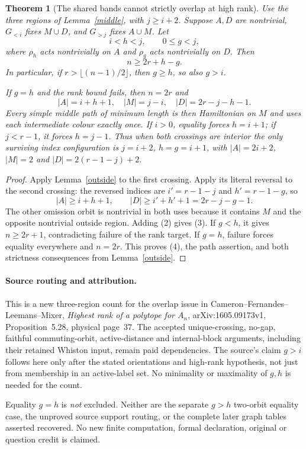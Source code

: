 \documentclass[11pt,a4paper]{article}
\newtheorem{theorem}[lemma]{Theorem}
\begin{document}
\begin{theorem}[The shared bands cannot strictly overlap at high rank]
\label{overlap}
Use the three regions of Lemma~\ref{middle}, with $j\geq i+2$.
Suppose $A,D$ are nontrivial, $G_{<i}$ fixes $M\cup D$,
and $G_{>j}$ fixes $A\cup M$. Let
\[
 i<h<j,\qquad 0\leq g<j,
\]
where $\rho_h$ acts nontrivially on $A$ and $\rho_g$ acts
nontrivially on $D$. Then
\[
                              n\geq2r+h-g.              \tag{3}
\]
In particular, if $r>\lfloor(n-1)/2\rfloor$, then $g\geq h$,
so also $g>i$.

If $g=h$ and the rank bound fails, then $n=2r$ and
\[
 |A|=i+h+1,\quad |M|=j-i,\quad |D|=2r-j-h-1.           \tag{4}
\]
Every simple middle path of minimum length is then Hamiltonian
on $M$ and uses each intermediate colour exactly once.
If $i>0$, equality forces $h=i+1$; if $j<r-1$, it forces
$h=j-1$. Thus when both crossings are interior the only surviving
index configuration is $j=i+2$, $h=g=i+1$, with
$|A|=2i+2$, $|M|=2$ and $|D|=2(r-1-j)+2$.
\end{theorem}
\begin{proof}
Apply Lemma~\ref{outside} to the first crossing. Apply its
literal reversal to the second crossing: the reversed indices
are $i'=r-1-j$ and $h'=r-1-g$, so
\[
 |A|\geq i+h+1,\qquad
 |D|\geq i'+h'+1=2r-j-g-1.
\]
The other omission orbit is nontrivial in both uses because
it contains $M$ and the opposite nontrivial outside region.
Adding (2) gives (3). If $g<h$, it gives $n\geq2r+1$,
contradicting failure of the rank target. If $g=h$, failure
forces equality everywhere and $n=2r$. This proves (4), the
path assertion, and both strictness consequences from
Lemma~\ref{outside}.
\end{proof}

\paragraph{Source routing and attribution.}
This is a new three-region count for the overlap issue in
Cameron--Fernandes--Leemans--Mixer, \emph{Highest rank of a polytope
for $A_n$}, arXiv:1605.09173v1, Proposition~5.28, physical page~37.
The accepted unique-crossing, no-gap, faithful commuting-orbit,
active-distance and internal-block arguments, including their
retained Whiston input, remain paid dependencies. The source's
claim $g>i$ follows here only after the stated orientations and
high-rank hypothesis, not just from membership in an active-label
set. No minimality or maximality of $g,h$ is needed for the count.

Equality $g=h$ is \emph{not} excluded. Neither are the separate
$g>h$ two-orbit equality case, the unproved source support routing,
or the complete later graph tables asserted recovered. No new
finite computation, formal declaration, original or question
credit is claimed.
\end{document}
